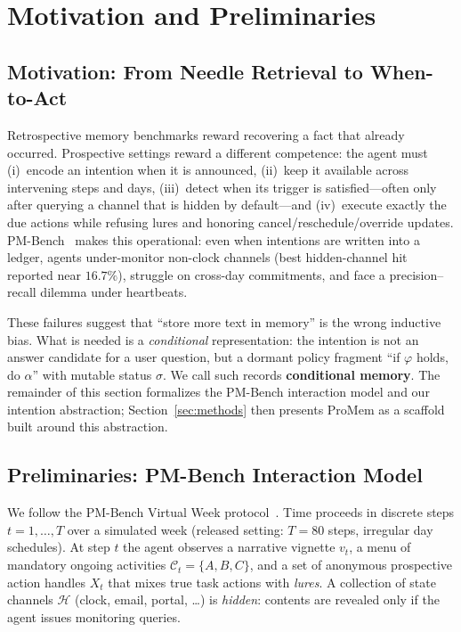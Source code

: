 \section{Motivation and Preliminaries}

\subsection{Motivation: From Needle Retrieval to When-to-Act}

Retrospective memory benchmarks reward recovering a fact that already occurred. Prospective settings reward a different competence: the agent must (i)~encode an intention when it is announced, (ii)~keep it available across intervening steps and days, (iii)~detect when its trigger is satisfied---often only after querying a channel that is hidden by default---and (iv)~execute exactly the due actions while refusing lures and honoring cancel/reschedule/override updates. PM-Bench~\cite{pmbench2026} makes this operational: even when intentions are written into a ledger, agents under-monitor non-clock channels (best hidden-channel hit reported near $16.7\%$), struggle on cross-day commitments, and face a precision--recall dilemma under heartbeats.

These failures suggest that ``store more text in memory'' is the wrong inductive bias. What is needed is a \emph{conditional} representation: the intention is not an answer candidate for a user question, but a dormant policy fragment ``if $\varphi$ holds, do $\alpha$'' with mutable status $\sigma$. We call such records \textbf{conditional memory}. The remainder of this section formalizes the PM-Bench interaction model and our intention abstraction; Section~\ref{sec:methods} then presents ProMem as a scaffold built around this abstraction.

\subsection{Preliminaries: PM-Bench Interaction Model}

We follow the PM-Bench Virtual Week protocol~\cite{pmbench2026}. Time proceeds in discrete steps $t=1,\ldots,T$ over a simulated week (released setting: $T{=}80$ steps, irregular day schedules). At step $t$ the agent observes a narrative vignette $v_t$, a menu of mandatory ongoing activities $\mathcal{C}_t=\{A,B,C\}$, and a set of anonymous prospective action handles $X_t$ that mixes true task actions with \emph{lures}. A collection of state channels $\mathcal{H}$ (clock, email, portal, \ldots) is \emph{hidden}: contents are revealed only if the agent issues monitoring queries.

